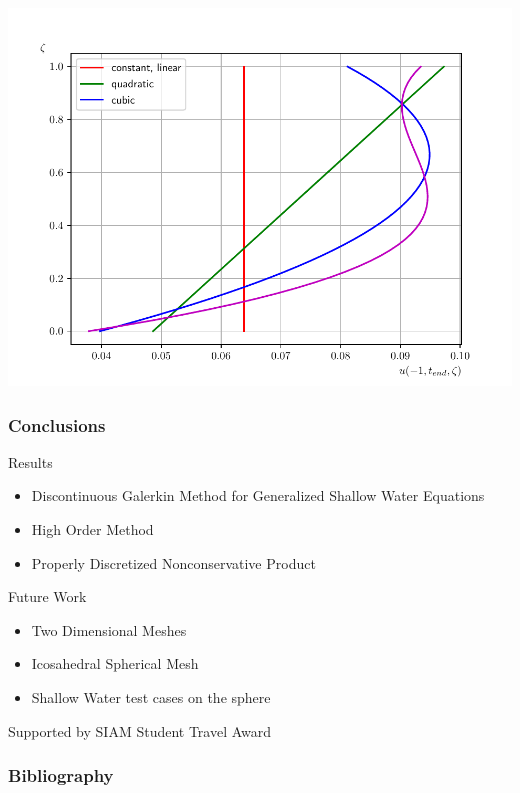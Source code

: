 \documentclass[10pt]{beamer}
\begin{document}
\begin{frame}
  \includegraphics[scale=0.29]{Figures/velocity_profile_-1_dam.pdf}
\end{frame}

\begin{frame}
  \frametitle{Conclusions}
  Results
  \begin{itemize}
    \item Discontinuous Galerkin Method for Generalized Shallow Water Equations
    \item High Order Method
    \item Properly Discretized Nonconservative Product
  \end{itemize}
  Future Work
  \begin{itemize}
    \item Two Dimensional Meshes
    \item Icosahedral Spherical Mesh
    \item Shallow Water test cases on the sphere
  \end{itemize}

  Supported by SIAM Student Travel Award
\end{frame}

\begin{frame}[allowframebreaks]
  \frametitle{Bibliography}
  \nocite{*}
  \printbibliography{}
\end{frame}
\end{document}
